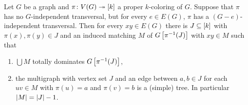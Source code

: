 \begin{lem}\label{BaseTransversalLemma}
Let $G$ be a graph and $\pi\colon V(G) \twoheadrightarrow \left[k\right]$ a proper $k$-coloring of
$G$.  Suppose that $\pi$ has no $G$-independent transversal, but for every $e
\in E(G)$, $\pi$ has a $(G-e)$-independent transversal. Then for every $xy \in
E(G)$ there is $J \subseteq \left[k\right]$ with $\pi(x), \pi(y) \in J$ and an 
induced matching $M$ of $G\left[ \pi^{-1}(J) \right]$ with $xy \in M$ such that
\begin{enumerate}
  \item $\bigcup M$ totally dominates $G\left[ \pi^{-1}(J) \right]$,
  \item the multigraph with vertex set $J$ and an edge between $a, b \in J$ for
  each $uv \in M$ with $\pi(u) = a$ and $\pi(v) = b$ is a (simple) tree.  In
  particular $\left|M\right| = \left|J\right| - 1$.
\end{enumerate}
\end{lem}
